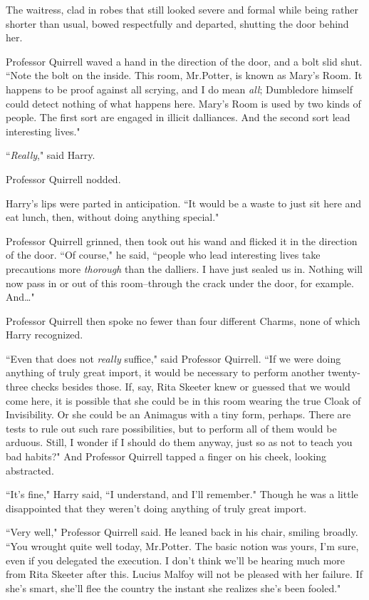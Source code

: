 The waitress, clad in robes that still looked severe and formal while being rather shorter than usual, bowed respectfully and departed, shutting the door behind her.

Professor Quirrell waved a hand in the direction of the door, and a bolt slid shut. ``Note the bolt on the inside. This room, Mr.\?Potter, is known as Mary's Room. It happens to be proof against all scrying, and I do mean \emph{all}; Dumbledore himself could detect nothing of what happens here. Mary's Room is used by two kinds of people. The first sort are engaged in illicit dalliances. And the second sort lead interesting lives."

``\emph{Really}," said Harry.

Professor Quirrell nodded.

Harry's lips were parted in anticipation. ``It would be a waste to just sit here and eat lunch, then, without doing anything special."

Professor Quirrell grinned, then took out his wand and flicked it in the direction of the door. ``Of course," he said, ``people who lead interesting lives take precautions more \emph{thorough} than the dalliers. I have just sealed us in. Nothing will now pass in or out of this room\---through the crack under the door, for example. And{\ldots}"

Professor Quirrell then spoke no fewer than four different Charms, none of which Harry recognized.

``Even that does not \emph{really} suffice," said Professor Quirrell. ``If we were doing anything of truly great import, it would be necessary to perform another twenty-three checks besides those. If, say, Rita Skeeter knew or guessed that we would come here, it is possible that she could be in this room wearing the true Cloak of Invisibility. Or she could be an Animagus with a tiny form, perhaps. There are tests to rule out such rare possibilities, but to perform all of them would be arduous. Still, I wonder if I should do them anyway, just so as not to teach you bad habits?" And Professor Quirrell tapped a finger on his cheek, looking abstracted.

``It's fine," Harry said, ``I understand, and I'll remember." Though he was a little disappointed that they weren't doing anything of truly great import.

``Very well," Professor Quirrell said. He leaned back in his chair, smiling broadly. ``You wrought quite well today, Mr.\?Potter. The basic notion was yours, I'm sure, even if you delegated the execution. I don't think we'll be hearing much more from Rita Skeeter after this. Lucius Malfoy will not be pleased with her failure. If she's smart, she'll flee the country the instant she realizes she's been fooled."

